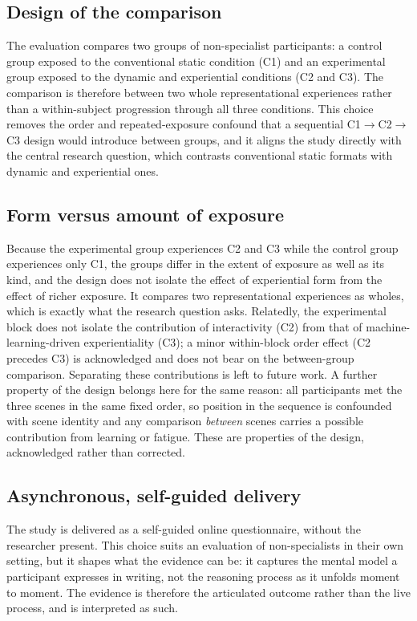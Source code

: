 \subsection*{Design of the comparison}
The evaluation compares two groups of non-specialist participants: a control group exposed to the conventional static condition (C1) and an experimental group exposed to the dynamic and experiential conditions (C2 and C3). The comparison is therefore between two whole representational experiences rather than a within-subject progression through all three conditions. This choice removes the order and repeated-exposure confound that a sequential C1$\rightarrow$C2$\rightarrow$C3 design would introduce between groups, and it aligns the study directly with the central research question, which contrasts conventional static formats with dynamic and experiential ones.

\subsection*{Form versus amount of exposure}
Because the experimental group experiences C2 and C3 while the control group experiences only C1, the groups differ in the extent of exposure as well as its kind, and the design does not isolate the effect of experiential form from the effect of richer exposure. It compares two representational experiences as wholes, which is exactly what the research question asks. Relatedly, the experimental block does not isolate the contribution of interactivity (C2) from that of machine-learning-driven experientiality (C3); a minor within-block order effect (C2 precedes C3) is acknowledged and does not bear on the between-group comparison. Separating these contributions is left to future work. A further property of the design belongs here for the same reason: all participants met the three scenes in the same fixed order, so position in the sequence is confounded with scene identity and any comparison \emph{between} scenes carries a possible contribution from learning or fatigue. These are properties of the design, acknowledged rather than corrected.

\subsection*{Asynchronous, self-guided delivery}
The study is delivered as a self-guided online questionnaire, without the researcher present. This choice suits an evaluation of non-specialists in their own setting, but it shapes what the evidence can be: it captures the mental model a participant expresses in writing, not the reasoning process as it unfolds moment to moment. The evidence is therefore the articulated outcome rather than the live process, and is interpreted as such.

